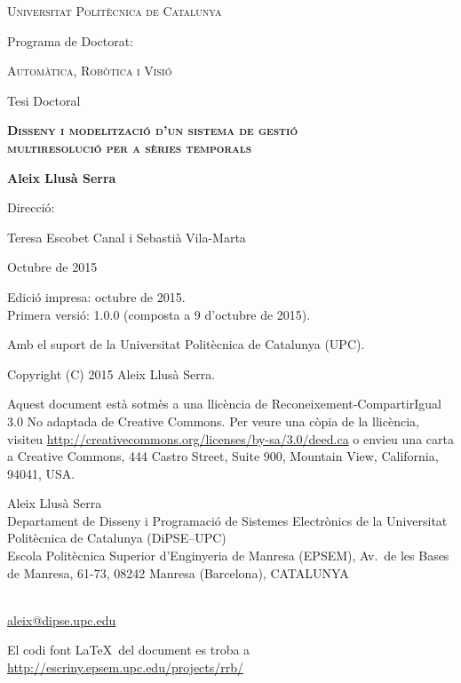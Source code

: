 \begin{titlepage}
  \begin{center} 

   

    {\Large \scshape Universitat Politècnica de Catalunya} \vskip 1cm 

    {Programa de Doctorat:} \vskip 0.5cm 
    
    {\scshape Automàtica, Robòtica i Visió} \vfill%

    {Tesi Doctoral} \vskip 1cm 
    
    {\scshape \bfseries \Large Disseny i modelització d'un sistema de gestió\\
 multiresolució per a sèries temporals} \vskip 2cm

    {\bfseries Aleix Llusà Serra} \vfill%

    {Direcció:}
       
    {Teresa Escobet Canal i
    Sebastià Vila-Marta}  \vskip 1cm 

    {Octubre de 2015}

\end{center}
\end{titlepage}


{
  \thispagestyle{empty}

  \mbox{}

  \vfill

  Edició impresa: octubre de 2015. %
  \\
  {\small Primera versió: 1.0.0 (composta a 9 d'octubre de 2015).} 

  \mbox{}

  {\footnotesize
  Amb el suport de la Universitat Politècnica de Catalunya (UPC).
  

  }

  \cc\bysa

  {\small
  Copyright (C) 2015 Aleix Llusà Serra.
  

  {\footnotesize
    Aquest document està sotmès a una llicència de Reconeixement-CompartirIgual 3.0 No adaptada de Creative Commons. Per veure una còpia de la llicència, visiteu \url{http://creativecommons.org/licenses/by-sa/3.0/deed.ca} o envieu una carta a Creative Commons, 444 Castro Street, Suite 900, Mountain View, California, 94041, USA.
  }

    Aleix Llusà Serra\\
    Departament de Disseny i Programació de Sistemes Electrònics
      de la Universitat Politècnica de Catalunya (DiPSE--UPC)\\
    Escola Politècnica Superior d'Enginyeria de Manresa (EPSEM),
    Av.\ de les Bases de Manresa, 61-73,
    08242 Manresa (Barcelona),
    CATALUNYA 
    }\\
    \url{aleix@dipse.upc.edu}

    {\footnotesize
      El codi font \LaTeX\ del document es troba a 
      \url{http://escriny.epsem.upc.edu/projects/rrb/}
    }
}





